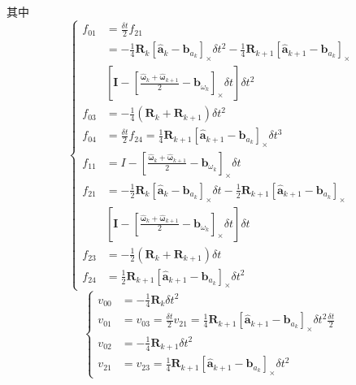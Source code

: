 其中
\begin{equation}
\label{eqn:3.52}
\left\{
\begin{aligned}
f_{01} &= \frac{\delta t}{2} f_{21} \\
&= -\frac{1}{4} \mathbf{R}_{k}\left[\hat{\mathbf{a}}_{k}-\mathbf{b}_{a_{k}}\right]_\times \delta t^{2}-\frac{1}{4} \mathbf{R}_{k+1}\left[\hat{\mathbf{a}}_{k+1}-\mathbf{b}_{a_{k}}\right]_\times \\ 
& \left[\mathbf{I}-\left[\frac{\hat{\bm{\omega}}_{k}+\hat{\bm{\omega}}_{k+1}}{2}-\mathbf{b}_{\omega_{k}}\right]_\times \delta t\right] \delta t^{2} \\
f_{03} &= -\frac{1}{4}\left(\mathbf{R}_{k}+\mathbf{R}_{k+1}\right) \delta t^{2} \\
f_{04} &= \frac{\delta t}{2} f_{24}=\frac{1}{4} \mathbf{R}_{k+1}\left[\hat{\mathbf{a}}_{k+1}-\mathbf{b}_{a_{k}}\right]_\times \delta t^{3} \\
f_{11} &= I-\left[\frac{\hat{\bm{\omega}}_{k}+\hat{\bm{\omega}}_{k+1}}{2}-\mathbf{b}_{\omega_{k}}\right]_\times \delta t \\
f_{21} &= -\frac{1}{2} \mathbf{R}_{k}\left[\hat{\mathbf{a}}_{k}-\mathbf{b}_{a_{k}}\right]_\times \delta t-\frac{1}{2} \mathbf{R}_{k+1}\left[\hat{\mathbf{a}}_{k+1}-\mathbf{b}_{a_{k}}\right]_\times \\ 
& \left[\mathbf{I}-\left[\frac{\hat{\bm{\omega}}_{k}+\hat{\bm{\omega}}_{k+1}}{2}-\mathbf{b}_{\omega_{k}}\right]_\times \delta t\right] \delta t \\
f_{23} &= -\frac{1}{2}\left(\mathbf{R}_{k}+\mathbf{R}_{k+1}\right) \delta t \\
f_{24} &= \frac{1}{2} \mathbf{R}_{k+1}\left[\hat{\mathbf{a}}_{k+1}-\mathbf{b}_{a_{k}}\right]_\times \delta t^{2} 
\end{aligned}
\right.
\end{equation}
\begin{equation}
\label{eqn:3.53}
\left\{
\begin{aligned}
v_{00} &= -\frac{1}{4} \mathbf{R}_{k} \delta t^{2} \\
v_{01} &= v_{03}=\frac{\delta t}{2} v_{21}=\frac{1}{4} \mathbf{R}_{k+1}\left[\hat{\mathbf{a}}_{k+1}-\mathbf{b}_{a_{k}}\right]_\times \delta t^{2} \frac{\delta t}{2} \\
v_{02} &= -\frac{1}{4} \mathbf{R}_{k+1} \delta t^{2} \\
v_{21} &= v_{23}=\frac{1}{4} \mathbf{R}_{k+1}\left[\hat{\mathbf{a}}_{k+1}-\mathbf{b}_{a_{k}}\right]_\times \delta t^{2}
\end{aligned}
\right.
\end{equation}
